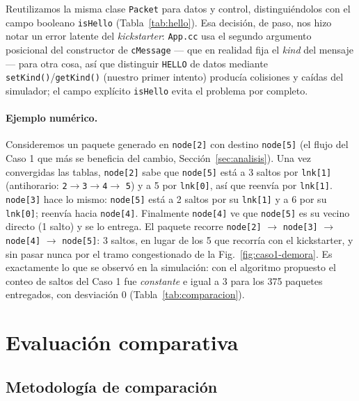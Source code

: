 \documentclass[10pt,letterpaper,twocolumn]{article}
\begin{document}
Reutilizamos la misma clase \texttt{Packet} para datos y control,
distinguiéndolos con el campo booleano \texttt{isHello} (Tabla~\ref{tab:hello}).
Esa decisión, de paso, nos hizo notar un error latente del \emph{kickstarter}:
\texttt{App.cc} usa el segundo argumento posicional del constructor de
\texttt{cMessage} --- que en realidad fija el \emph{kind} del mensaje --- para
otra cosa, así que distinguir \texttt{HELLO} de datos mediante
\texttt{setKind()}/\texttt{getKind()} (nuestro primer intento) producía
colisiones y caídas del simulador; el campo explícito \texttt{isHello} evita el
problema por completo.

\paragraph{Ejemplo numérico.} Consideremos un paquete generado en
\texttt{node[2]} con destino \texttt{node[5]} (el flujo del Caso 1 que más se
beneficia del cambio, Sección~\ref{sec:analisis}). Una vez convergidas las
tablas, \texttt{node[2]} sabe que \texttt{node[5]} está a 3 saltos por
\texttt{lnk[1]} (antihorario: \texttt{2}$\to$\texttt{3}$\to$\texttt{4}$\to$%
\texttt{5}) y a 5 por \texttt{lnk[0]}, así que reenvía por \texttt{lnk[1]}.
\texttt{node[3]} hace lo mismo: \texttt{node[5]} está a 2 saltos por su
\texttt{lnk[1]} y a 6 por su \texttt{lnk[0]}; reenvía hacia \texttt{node[4]}.
Finalmente \texttt{node[4]} ve que \texttt{node[5]} es su vecino directo (1
salto) y se lo entrega. El paquete recorre \texttt{node[2]} $\to$
\texttt{node[3]} $\to$ \texttt{node[4]} $\to$ \texttt{node[5]}: 3 saltos, en
lugar de los 5 que recorría con el kickstarter, y sin pasar nunca por el tramo
congestionado de la Fig.~\ref{fig:caso1-demora}. Es exactamente lo que se
observó en la simulación: con el algoritmo propuesto el conteo de saltos del
Caso 1 fue \emph{constante} e igual a 3 para los 375 paquetes entregados, con
desviación 0 (Tabla~\ref{tab:comparacion}).

\section{Evaluación comparativa}
\label{sec:evaluacion}

\subsection{Metodología de comparación}
\end{document}
